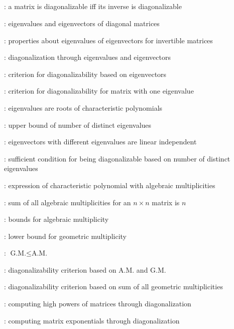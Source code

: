 \subsection*{}
\item {}: a matrix is diagonalizable iff its inverse is diagonalizable
\item {}: eigenvalues and eigenvectors of diagonal matrices
\item {}: properties about eigenvalues of eigenvectors for invertible matrices
\item {}: diagonalization through eigenvalues and eigenvectors
\item {}: criterion for diagonalizability based on eigenvectors
\item {}: criterion for diagonalizability for matrix with one eigenvalue
\item {}: eigenvalues are roots of characteristic polynomials
\item {}: upper bound of number of distinct eigenvalues
\item {}: eigenvectors with different eigenvalues are linear independent
\item {}: sufficient condition for being diagonalizable based on number of distinct eigenvalues
\item {}: expression of characteristic polynomial with algebraic multiplicities
\item {}: sum of all algebraic multiplicities for an \(n\times n\) matrix is \(n\)
\item {}: bounds for algebraic multiplicity
\item {}: lower bound for geometric multiplicity
\item {}: \(\text{G.M.}\leq\text{A.M.}\)
\item {}: diagonalizability criterion based on A.M. and G.M.
\item {}: diagonalizability criterion based on sum of all geometric multiplicities
\item {}: computing high powers of matrices through diagonalization
\item {}: computing matrix exponentials through diagonalization
